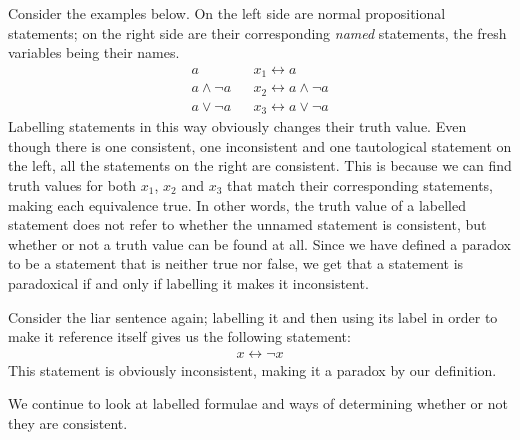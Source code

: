 Consider the examples below.
On the left side are normal propositional statements;
on the right side are their corresponding \textit{named} statements, the fresh variables being their names.
\begin{align}
  a               && x_1 \leftrightarrow a\\
  a \wedge \neg a && x_2 \leftrightarrow a \wedge \neg a\\
  a \vee \neg a   && x_3 \leftrightarrow a \vee \neg a
\end{align}
Labelling statements in this way obviously changes their truth value.
Even though there is one consistent, one inconsistent and one tautological statement on the left, all the statements on the right are consistent.
This is because we can find truth values for both $x_1$, $x_2$ and $x_3$ that match their corresponding statements, making each equivalence true.
In other words, the truth value of a labelled statement does not refer to whether the unnamed statement is consistent, but whether or not a truth value can be found at all.
Since we have defined a paradox to be a statement that is neither true nor false, we get that a statement is paradoxical if and only if labelling it makes it inconsistent.

Consider the liar sentence again;
labelling it and then using its label in order to make it reference itself gives us the following statement:
\begin{align}
  x \leftrightarrow \neg x
\end{align}
This statement is obviously inconsistent, making it a paradox by our definition.

We continue to look at labelled formulae and ways of determining whether or not they are consistent.
